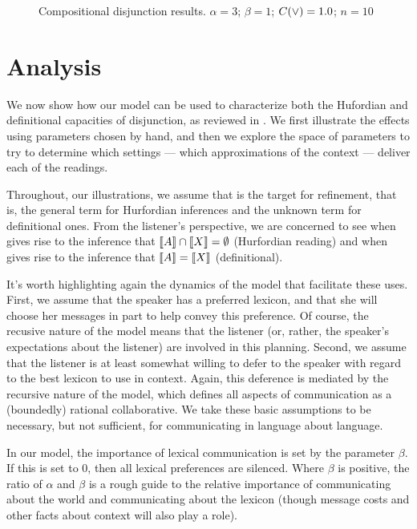\documentclass{article}
\begin{document}
\begin{figure}[tp]
\begin{subfigure}{0.48\textwidth}
  \end{subfigure}
  \caption{Compositional disjunction results. $\alpha = 3$; $\beta = 1$; $C(\vee) = 1.0$; $n = 10$}
  \label{fig:compdisj}
\end{figure}




\section{Analysis}\label{sec:analysis}

We now show how our model can be used to characterize both the
Hufordian and definitional capacities of disjunction, as reviewed in
. We first illustrate the effects using parameters
chosen by hand, and then we explore the space of parameters to try to
determine which settings --- which approximations of the context ---
deliver each of the readings. 

Throughout, our illustrations, we assume that  is the target
for refinement, that is, the general term for Hurfordian inferences
and the unknown term for definitional ones.  From the listener's
perspective, we are concerned to see when  gives rise to
the inference that $\llbracket A\rrbracket \cap \llbracket X\rrbracket = \emptyset$ (Hurfordian
reading) and when  gives rise to the inference that
$\llbracket A\rrbracket = \llbracket X\rrbracket$ (definitional).

It's worth highlighting again the dynamics of the model that
facilitate these uses. First, we assume that the speaker has a
preferred lexicon, and that she will choose her messages in part to
help convey this preference. Of course, the recusive nature of the
model means that the listener (or, rather, the speaker's expectations
about the listener) are involved in this planning. Second, we assume
that the listener is at least somewhat willing to defer to the speaker
with regard to the best lexicon to use in context. Again, this
deference is mediated by the recursive nature of the model, which
defines all aspects of communication as a (boundedly) rational
collaborative. We take these basic assumptions to be necessary, but
not sufficient, for communicating in language about language.

In our model, the importance of lexical communication is set by the
parameter $\beta$. If this is set to $0$, then all lexical preferences
are silenced. Where $\beta$ is positive, the ratio of $\alpha$ and
$\beta$ is a rough guide to the relative importance of communicating
about the world and communicating about the lexicon (though message
costs and other facts about context will also play a role).
\end{document}
